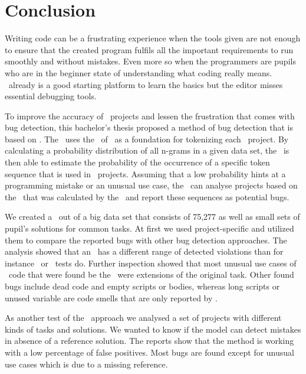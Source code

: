\chapter{Conclusion}\label{chap:conclusion}

Writing code can be a frustrating experience when the tools given are not enough to ensure that the created program fulfils all the important requirements to run smoothly and without mistakes. Even more so when the programmers are pupils who are in the beginner state of understanding what coding really means. \scratch\ already is a good starting platform to learn the basics but the editor misses essential debugging tools.

To improve the accuracy of \scratch\ projects and lessen the frustration that comes with bug detection, this bachelor's thesis proposed a method of bug detection that is based on . The \tokenizer\ uses the \AST\ of \litterbox\ as a foundation for tokenizing each \scratch\ project. By calculating a probability distribution of all n-grams in a given data set, the \ngramtrainer\ is then able to estimate the probability of the occurrence of a specific token sequence that is used in \scratch\ projects. Assuming that a low probability hints at a programming mistake or an unusual use case, the \ngrambugfinder\ can analyse projects based on the \ngram\ that was calculated by the \ngramtrainer\ and report these sequences as potential bugs.

We created a \ngram\ out of a big data set that consists of 75,277 as well as small sets of pupil's solutions for common tasks. At first we used project-specific  and utilized them to compare the reported bugs with other bug detection approaches. The analysis showed that an \ngram\ has a different range of detected violations than for instance \litterbox\ or \whisker\ tests do. Further inspection showed that most unusual use cases of \scratch\ code that were found be the \ngram\ were extensions of the original task. Other found bugs include dead code and empty scripts or bodies, whereas long scripts or unused variable are code smells that are only reported by \litterbox{}. 

As another test of the \ngram\ approach we analysed a set of projects with different kinds of tasks and solutions. We wanted to know if the model can detect mistakes in absence of a reference solution. The reports show that the method is working with a low percentage of false positives. Most bugs are found except for unusual use cases which is due to a missing reference.

